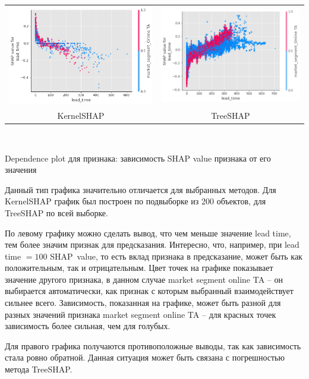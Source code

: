 \begin{tabular}{c|c}
	\arrayrulecolor[rgb]{0.8,0.85,1}
	\includegraphics[width=0.47\linewidth]{pics/myshap6.png} & \includegraphics[width=0.47\linewidth]{pics/myshap6t.png} \\
	KernelSHAP & TreeSHAP \\
\end{tabular}\\[-6mm]
\begin{center}
	Dependence plot для признака: зависимость SHAP value признака от его значения
\end{center}
\vspace{-3mm}

Данный тип графика значительно отличается для выбранных методов. Для KernelSHAP график был построен по подвыборке из 200 объектов, для TreeSHAP по всей выборке.

По левому графику можно сделать вывод, что чем меньше значение lead time, тем более значим признак для предсказания. Интересно, что, например, при lead time $=100$ SHAP~value, то есть вклад признака в предсказание, может быть как положительным, так и отрицательным. Цвет точек на графике показывает значение другого признака, в данном случае market segment online TA -- он выбирается автоматически, как признак с которым выбранный взаимодействует сильнее всего. Зависимость, показанная на графике, может быть разной для разных значений признака market segment online TA -- для красных точек зависимость более сильная, чем для голубых.

Для правого графика получаются противоположные выводы, так как зависимость стала ровно обратной. Данная ситуация может быть связана с погрешностью метода TreeSHAP.


